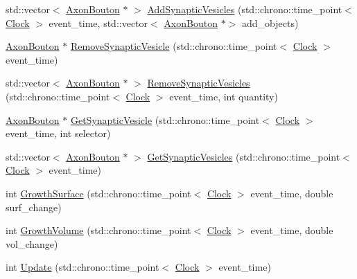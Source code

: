 \begin{DoxyCompactItemize}
\item 
std\+::vector$<$ \hyperlink{class_axon_bouton}{Axon\+Bouton} $\ast$ $>$ \hyperlink{class_axon_bouton_a0e264da88f6ca5d77aa42f415cb4f3aa}{Add\+Synaptic\+Vesicles} (std\+::chrono\+::time\+\_\+point$<$ \hyperlink{universe_8h_a0ef8d951d1ca5ab3cfaf7ab4c7a6fd80}{Clock} $>$ event\+\_\+time, std\+::vector$<$ \hyperlink{class_axon_bouton}{Axon\+Bouton} $\ast$$>$ add\+\_\+objects)
\item 
\hyperlink{class_axon_bouton}{Axon\+Bouton} $\ast$ \hyperlink{class_axon_bouton_a1f0b13fa7ec408c9e0cfb22cea9bbe8c}{Remove\+Synaptic\+Vesicle} (std\+::chrono\+::time\+\_\+point$<$ \hyperlink{universe_8h_a0ef8d951d1ca5ab3cfaf7ab4c7a6fd80}{Clock} $>$ event\+\_\+time)
\item 
std\+::vector$<$ \hyperlink{class_axon_bouton}{Axon\+Bouton} $\ast$ $>$ \hyperlink{class_axon_bouton_ae4119170ef72beaed3c8a0eb1d80ef14}{Remove\+Synaptic\+Vesicles} (std\+::chrono\+::time\+\_\+point$<$ \hyperlink{universe_8h_a0ef8d951d1ca5ab3cfaf7ab4c7a6fd80}{Clock} $>$ event\+\_\+time, int quantity)
\item 
\hyperlink{class_axon_bouton}{Axon\+Bouton} $\ast$ \hyperlink{class_axon_bouton_a847ab3d3d214ddc85bdfd463c6d95d54}{Get\+Synaptic\+Vesicle} (std\+::chrono\+::time\+\_\+point$<$ \hyperlink{universe_8h_a0ef8d951d1ca5ab3cfaf7ab4c7a6fd80}{Clock} $>$ event\+\_\+time, int selector)
\item 
std\+::vector$<$ \hyperlink{class_axon_bouton}{Axon\+Bouton} $\ast$ $>$ \hyperlink{class_axon_bouton_af9a35ff7a6c32ac291021cccb3d40c9b}{Get\+Synaptic\+Vesicles} (std\+::chrono\+::time\+\_\+point$<$ \hyperlink{universe_8h_a0ef8d951d1ca5ab3cfaf7ab4c7a6fd80}{Clock} $>$ event\+\_\+time)
\item 
int \hyperlink{class_axon_bouton_a95fc006b2436e2c7784af2cc0bc9522e}{Growth\+Surface} (std\+::chrono\+::time\+\_\+point$<$ \hyperlink{universe_8h_a0ef8d951d1ca5ab3cfaf7ab4c7a6fd80}{Clock} $>$ event\+\_\+time, double surf\+\_\+change)
\item 
int \hyperlink{class_axon_bouton_a10ac4446e777376a3944c87b2bcf26b5}{Growth\+Volume} (std\+::chrono\+::time\+\_\+point$<$ \hyperlink{universe_8h_a0ef8d951d1ca5ab3cfaf7ab4c7a6fd80}{Clock} $>$ event\+\_\+time, double vol\+\_\+change)
\item 
int \hyperlink{class_axon_bouton_a26f89bac681b8f0894fe1ae249733917}{Update} (std\+::chrono\+::time\+\_\+point$<$ \hyperlink{universe_8h_a0ef8d951d1ca5ab3cfaf7ab4c7a6fd80}{Clock} $>$ event\+\_\+time)
\end{DoxyCompactItemize}

